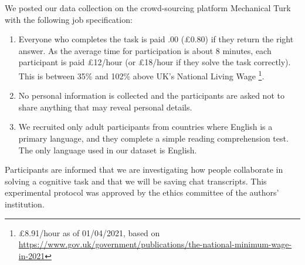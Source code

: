 \documentclass[acmsmall,manuscript,screen]{acmart}
\begin{document}
We posted our data collection on the crowd-sourcing platform Mechanical Turk with the following job specification:
\begin{enumerate}
\item Everyone who completes the task is paid \1.00 (£0.80) if they return the right answer.
    As the average time for participation is about 8 minutes, each participant is paid £12/hour (or £18/hour if they solve the task correctly). This is between 35\% and 102\% above UK's National Living Wage \footnote{£8.91/hour as of 01/04/2021, based on \url{https://www.gov.uk/government/publications/the-national-minimum-wage-in-2021}}.  
    \item No personal information is collected and the participants are asked not to share anything that may reveal personal details.
    \item We recruited only adult participants from countries where English is a primary language, and they complete a simple reading comprehension test. The only language used in our dataset is English.   
\end{enumerate}
 Participants are informed that we are investigating how people collaborate in solving a cognitive task and that we will be saving chat transcripts. This experimental protocol was approved by the ethics committee of the authors' institution.
 
\end{document}
